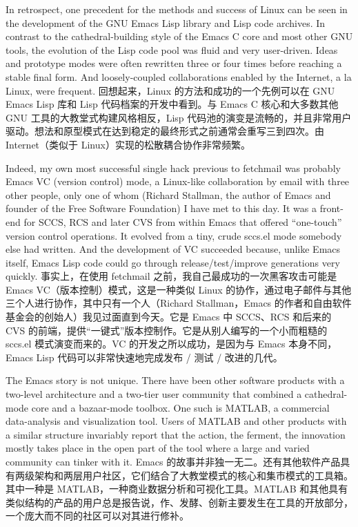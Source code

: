 \documentclass[a4paper,12pt,UTF8,twoside]{ctexbook}
\begin{document}
In retrospect, one precedent for the methods and success of Linux can be seen in the development of the GNU Emacs Lisp library and Lisp code archives. In contrast to the cathedral-building style of the Emacs C core and most other GNU tools, the evolution of the Lisp code pool was fluid and very user-driven. Ideas and prototype modes were often rewritten three or four times before reaching a stable final form. And loosely-coupled collaborations enabled by the Internet, a la Linux, were frequent.
回想起来，Linux 的方法和成功的一个先例可以在 GNU Emacs Lisp 库和 Lisp 代码档案的开发中看到。与 Emacs C 核心和大多数其他 GNU 工具的大教堂式构建风格相反，Lisp 代码池的演变是流畅的，并且非常用户驱动。想法和原型模式在达到稳定的最终形式之前通常会重写三到四次。由 Internet（类似于 Linux）实现的松散耦合协作非常频繁。

Indeed, my own most successful single hack previous to fetchmail was probably Emacs VC (version control) mode, a Linux-like collaboration by email with three other people, only one of whom (Richard Stallman, the author of Emacs and founder of the Free Software Foundation) I have met to this day. It was a front-end for SCCS, RCS and later CVS from within Emacs that offered ``one-touch'' version control operations. It evolved from a tiny, crude sccs.el mode somebody else had written. And the development of VC succeeded because, unlike Emacs itself, Emacs Lisp code could go through release/test/improve generations very quickly.
事实上，在使用 fetchmail 之前，我自己最成功的一次黑客攻击可能是 Emacs VC（版本控制）模式，这是一种类似 Linux 的协作，通过电子邮件与其他三个人进行协作，其中只有一个人（Richard Stallman，Emacs 的作者和自由软件基金会的创始人）我见过面直到今天。它是 Emacs 中 SCCS、RCS 和后来的 CVS 的前端，提供“一键式”版本控制作。它是从别人编写的一个小而粗糙的 sccs.el 模式演变而来的。VC 的开发之所以成功，是因为与 Emacs 本身不同，Emacs Lisp 代码可以非常快速地完成发布 / 测试 / 改进的几代。

The Emacs story is not unique. There have been other software products with a two-level architecture and a two-tier user community that combined a cathedral-mode core and a bazaar-mode toolbox. One such is MATLAB, a commercial data-analysis and visualization tool. Users of MATLAB and other products with a similar structure invariably report that the action, the ferment, the innovation mostly takes place in the open part of the tool where a large and varied community can tinker with it.
Emacs 的故事并非独一无二。还有其他软件产品具有两级架构和两层用户社区，它们结合了大教堂模式的核心和集市模式的工具箱。其中一种是 MATLAB，一种商业数据分析和可视化工具。MATLAB 和其他具有类似结构的产品的用户总是报告说，作、发酵、创新主要发生在工具的开放部分，一个庞大而不同的社区可以对其进行修补。
\end{document}

